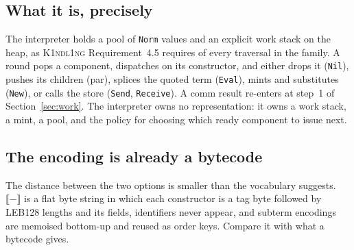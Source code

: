 \documentclass[11pt,a4paper]{article}
\newcommand{\code}[1]{\texttt{#1}}
\newcommand{\Kind}{\textsc{K1ndl1ng}}
\newcommand{\Camp}{\textsc{CampF1R3}}
\newcommand{\enc}[1]{\llbracket #1 \rrbracket}
\newcommand{\Norm}{\code{Norm}}
\theoremstyle{definition}
\theoremstyle{plain}
\begin{document}
\subsection{What it is, precisely}

The interpreter holds a pool of \Norm{} values and an explicit work stack on the
heap, as \Kind{} Requirement~4.5 requires of every traversal in the family. A
round pops a component, dispatches on its constructor, and either drops it
(\code{Nil}), pushes its children (par), splices the quoted term
(\code{Eval}), mints and substitutes (\code{New}), or calls the store
(\code{Send}, \code{Receive}). A comm result re-enters at step~1 of
Section~\ref{sec:work}. The interpreter owns no representation: it owns a work
stack, a mint, a pool, and the policy for choosing which ready component to
issue next.

\begin{center}
\end{center}

\subsection{The encoding is already a bytecode}\label{sec:already}

The distance between the two options is smaller than the vocabulary suggests.
$\enc{-}$ is a flat byte string in which each constructor is a tag byte followed
by LEB128 lengths and its fields, identifiers never appear, and subterm
encodings are memoised bottom-up and reused as order keys. Compare it with what
a bytecode gives.
\end{document}
